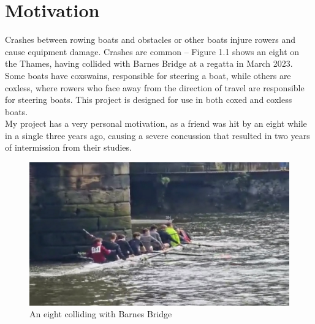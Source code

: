 \documentclass[12pt,a4paper]{report}
\begin{document}
\section{Motivation}	
Crashes between rowing boats and obstacles or other boats injure rowers and cause equipment damage. Crashes are common -- Figure 1.1 shows an eight on the Thames, having collided with Barnes Bridge at a regatta in March 2023.  Some boats have coxswains, responsible for steering a boat, while others are coxless, where rowers who face away from the direction of travel are responsible for steering boats. This project is designed for use in both coxed and coxless boats. \\
My project has a very personal motivation, as a friend was hit by an eight while in a single three years ago, causing a severe concussion that resulted in two years of intermission from their studies.
\begin{figure}[h]
\begin{center}
\caption{An eight colliding with Barnes Bridge \cite{boat}}
\includegraphics[scale=0.5]{boatCrash.jpg.png}
\end{center}
\end{figure}
\FloatBarrier
\end{document}
